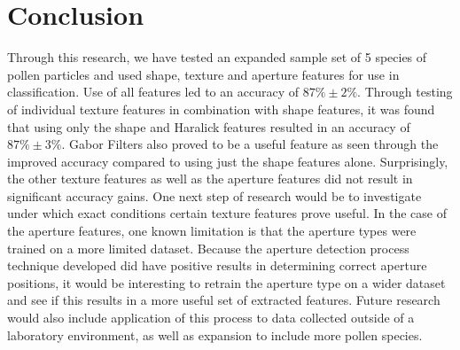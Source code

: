 \section{Conclusion}

Through this research, we have tested an expanded sample set of 5 species of pollen particles and used shape, texture and aperture features for use in classification. Use of all features led to an accuracy of $87\% \pm 2\%$. Through testing of individual texture features in combination with shape features, it was found that using only the shape and Haralick features resulted in an accuracy of $87\% \pm 3\%$. Gabor Filters also proved to be a useful feature as seen through the improved accuracy compared to using just the shape features alone. Surprisingly, the other texture features as well as the aperture features did not result in significant accuracy gains. One next step of research would be to investigate under which exact conditions certain texture features prove useful. In the case of the aperture features, one known limitation is that the aperture types were trained on a more limited dataset. Because the aperture detection process technique developed did have positive results in determining correct aperture positions, it would be interesting to retrain the aperture type on a wider dataset and see if this results in a more useful set of extracted features. Future research would also include application of this process to data collected outside of a laboratory environment, as well as expansion to include more pollen species.
    
  
  
  
  
  